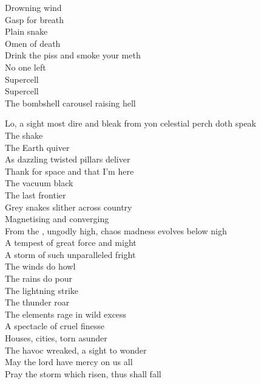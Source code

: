 Drowning wind\\
Gasp for breath\\
Plain snake\\
Omen of death\\
Drink the piss and smoke your meth\\
No one left\\

Supercell\\
Supercell\\
The bombshell carousel raising hell\\



Lo, a sight most dire and bleak from yon celestial perch doth speak\\
The  shake\\
The Earth quiver\\
As dazzling twisted pillars deliver\\

Thank  for space and that I'm here\\
The vacuum black\\
The last frontier\\
Grey snakes slither across country\\
Magnetising and converging\\

From the , ungodly high, chaos madness evolves below nigh\\
A tempest of great force and might\\
A storm of such unparalleled fright\\
The winds do howl\\
The rains do pour\\
The lightning strike\\
The thunder roar\\
The elements rage in wild excess\\
A spectacle of cruel finesse\\
Houses, cities, torn asunder\\
The havoc wreaked, a sight to wonder\\
May the lord have mercy on us all\\
Pray the storm which risen, thus shall fall\\

